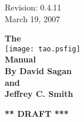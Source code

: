 \thispagestyle{empty}

\begin{flushright}
\large
  Revision: 0.4.11 \\
  March 19, 2007 \\
\end{flushright}

\vfill

{
\begin{center}
{\Huge \sf\bf The} \\
\vskip 0.1in
\texttt{[image: tao.psfig]} \\
\vskip 0.1in
{\Huge \sf\bf Manual} \\
\vskip 0.4in
{\Large \sf\bf By David Sagan \\ and \\ Jeffrey C. Smith} \\
\end{center}
}

\vskip 1in
\begin{center}
{\Huge \bf *** DRAFT ***}
\end{center}
\vfill
\break

